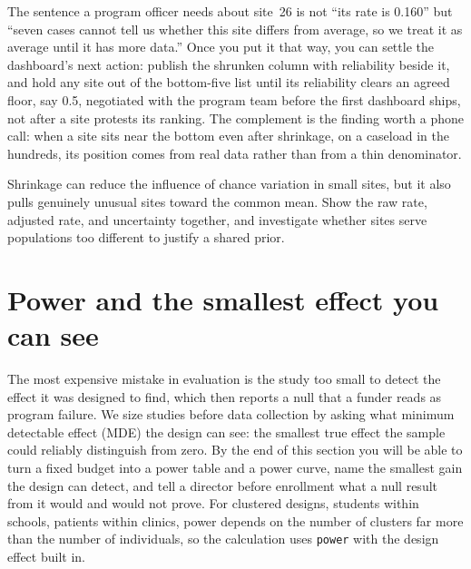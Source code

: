 \documentclass[
    a4paper,
    fontsize=10pt,
    twoside=true,
    numbers=noenddot,
]{kaobook}
\begin{document}
The sentence a program officer needs about site~26 is not \enquote{its rate is 0.160} but \enquote{seven cases cannot tell us whether this site differs from average, so we treat it as average until it has more data.} Once you put it that way, you can settle the dashboard's next action: publish the shrunken column with reliability beside it, and hold any site out of the bottom-five list until its reliability clears an agreed floor, say 0.5, negotiated with the program team before the first dashboard ships, not after a site protests its ranking. The complement is the finding worth a phone call: when a site sits near the bottom even after shrinkage, on a caseload in the hundreds, its position comes from real data rather than from a thin denominator.

Shrinkage can reduce the influence of chance variation in small sites, but it also pulls genuinely unusual sites toward the common mean. Show the raw rate, adjusted rate, and uncertainty together, and investigate whether sites serve populations too different to justify a shared prior.

\section{Power and the smallest effect you can see}\label{sec:mde}
The most expensive mistake in evaluation is the study too small to detect the effect it was designed to find, which then reports a null that a funder reads as program failure. We size studies before data collection by asking what minimum detectable effect (MDE) the design can see: the smallest true effect the sample could reliably distinguish from zero. By the end of this section you will be able to turn a fixed budget into a power table and a power curve, name the smallest gain the design can detect, and tell a director before enrollment what a null result from it would and would not prove. For clustered designs, students within schools, patients within clinics, power depends on the number of clusters far more than the number of individuals, so the calculation uses \texttt{power} with the design effect built in.
\end{document}
